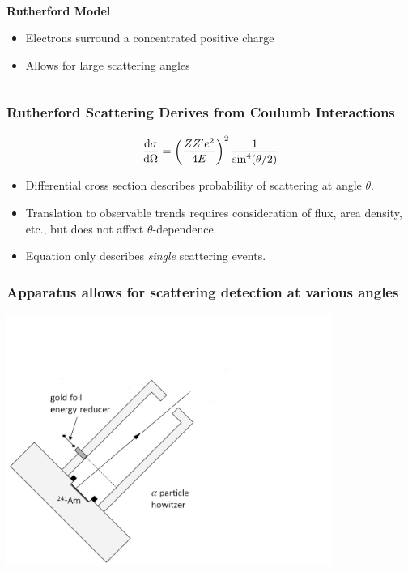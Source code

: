 \documentclass{beamer}
\begin{document}
\begin{frame}
\begin{columns}
\begin{column}{0.5\textwidth}
\begin{center}
      \\
      \textbf{Rutherford Model}
      \begin{itemize}
        \pause
      \item Electrons surround a concentrated positive charge
        \pause
      \item Allows for large scattering angles
    \end{itemize}
  \end{center}
  \end{column}
\end{columns}
\end{frame}


\begin{frame}
  \frametitle{Rutherford Scattering Derives from Coulumb Interactions}
  \begin{equation*}
    \dv{\sigma}{\Omega} = \left( \frac{Z Z' e^2}{4E}\right)^2 \frac{1}{\sin^4 (\theta/2)}
  \end{equation*}

  \begin{itemize}
    \item Differential cross section describes probability of scattering at angle $\theta$.
    \item Translation to observable trends requires consideration of flux, area density, etc., but does not affect $\theta$-dependence.
    \item Equation only describes \textit{single} scattering events.
  \end{itemize}
\end{frame}

\begin{frame}
  \frametitle{Apparatus allows for scattering detection at various angles}
  \begin{center}
  \includegraphics[width=0.8\textwidth]{apparatus-phi-detect-gold}
\end{center}
\end{frame}
\end{document}
